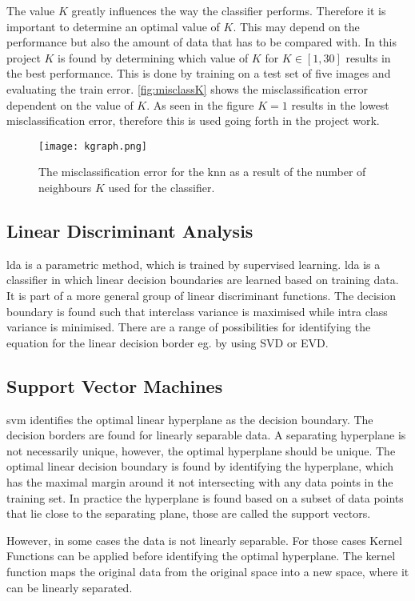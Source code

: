 The value $K$ greatly influences the way the classifier performs. Therefore it is important to determine an optimal value of $K$. This may depend on the performance but also the amount of data that has to be compared with. In this project $K$ is found by determining which value of $K$ for $K\in[1,30]$ results in the best performance. This is done by training on a test set of five images and evaluating the train error. \autoref{fig:misclassK} shows the misclassification error dependent on the value of $K$. As seen in the figure $K=1$ results in the lowest misclassification error, therefore this is used going forth in the project work.  
 \begin{figure}[H]
\centering
\texttt{[image: kgraph.png]}
\caption{The misclassification error for the \gls{knn} as a result of the number of neighbours $K$ used for the classifier.}
\label{fig:misclassK}
\end{figure}
\subsection{Linear Discriminant Analysis}
\gls{lda} is a parametric method, which is trained by supervised learning. \gls{lda} is a classifier in which linear decision boundaries are learned based on training data. It is part of a more general group of linear discriminant functions. The decision boundary is found such that interclass variance is maximised while intra class variance is minimised. There are a range of possibilities for identifying the equation for the linear decision border eg. by using SVD or EVD.    

\subsection{Support Vector Machines}
\gls{svm} identifies the optimal linear hyperplane as the decision boundary. The decision borders are found for linearly separable data. A separating hyperplane is not necessarily unique, however, the optimal hyperplane should be unique. The optimal linear decision boundary is found by identifying the hyperplane, which has the maximal margin around it not intersecting with any data points in the training set.
In practice the hyperplane is found based on a subset of data points that lie close to the separating plane, those are called the support vectors.    

However, in some cases the data is not linearly separable. For those cases Kernel Functions can be applied before identifying the optimal hyperplane. The kernel function maps the original data from the original space into a new space, where it can be linearly separated.  

